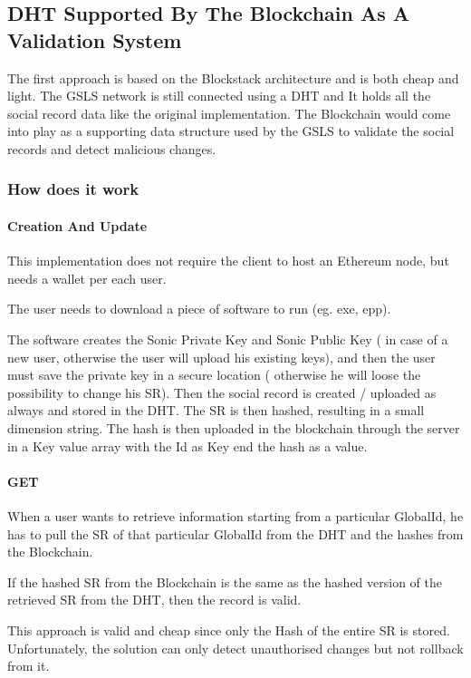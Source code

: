 \subsection{DHT Supported By The Blockchain As A Validation System}
The first approach is based on the Blockstack architecture and is both cheap and light. The GSLS network is still connected using a DHT and It holds all the social record data like the original implementation. The Blockchain would come into play as a supporting data structure used by the GSLS to validate the social records and detect malicious changes.

\subsubsection{How does it work}
\paragraph{Creation And Update}

This implementation does not require the client to host an Ethereum node, but needs a wallet per each user.

The user needs to download a piece of software to run (eg. exe, epp).

The software creates the Sonic Private Key and Sonic Public Key ( in case of a new user, otherwise the user will upload his existing keys), and then the user must save the private key in a secure location ( otherwise he will loose the possibility to change his SR).
Then the social record is created / uploaded as always and stored in the DHT.
The SR is then hashed, resulting in a small dimension string.
The hash is then uploaded in the blockchain through the server in a Key value array with the Id as Key end the hash as a value.

\paragraph{GET}

When a user wants to retrieve information starting from a particular GlobalId, he has to pull the SR of that particular GlobalId from the DHT and the hashes from the Blockchain.

If the hashed SR from the Blockchain is the same as the hashed version of the retrieved SR from the DHT, then the record is valid.

This approach is valid and cheap since only the Hash of the entire SR is stored.
Unfortunately, the solution can only detect unauthorised changes but not rollback from it.

